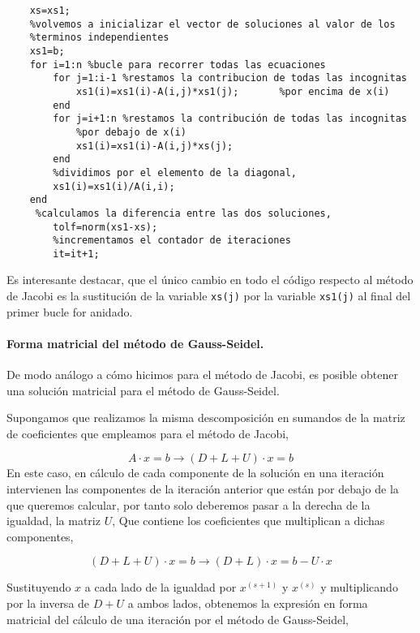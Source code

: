 \begin{verbatim}
    xs=xs1;
    %volvemos a inicializar el vector de soluciones al valor de los
    %terminos independientes
    xs1=b; 
    for i=1:n %bucle para recorrer todas las ecuaciones
        for j=1:i-1 %restamos la contribucion de todas las incognitas
            xs1(i)=xs1(i)-A(i,j)*xs1(j);       %por encima de x(i)
        end
        for j=i+1:n %restamos la contribución de todas las incognitas
            %por debajo de x(i)
            xs1(i)=xs1(i)-A(i,j)*xs(j);
        end
        %dividimos por el elemento de la diagonal,
        xs1(i)=xs1(i)/A(i,i);
    end
     %calculamos la diferencia entre las dos soluciones,
        tolf=norm(xs1-xs);
        %incrementamos el contador de iteraciones
        it=it+1;
\end{verbatim}

Es interesante destacar, que el único cambio en todo el código respecto al método de Jacobi es la sustitución de la variable \texttt{xs(j)} por la variable \texttt{xs1(j)} al final del primer bucle for anidado.

\paragraph{Forma matricial del método de Gauss-Seidel.}  De modo análogo a cómo hicimos para el método de Jacobi, es posible obtener una solución matricial para el método de Gauss-Seidel. 

Supongamos que realizamos la misma descomposición en sumandos de la matriz de coeficientes que empleamos para el método de Jacobi,

\begin{equation*}
A\cdot x =b \rightarrow (D+L+U)\cdot x=b
\end{equation*}  
En este caso, en cálculo de cada componente de la solución en una iteración intervienen las componentes de la iteración anterior que están por debajo de la que queremos calcular, por tanto solo deberemos pasar a la derecha de la igualdad, la matriz $U$, Que contiene los coeficientes que multiplican a dichas componentes,

\begin{equation*}
(D+L+U)\cdot x=b \rightarrow (D+L)\cdot x= b-U\cdot x
\end{equation*}

Sustituyendo $x$ a cada lado de la igualdad por $x^{(s+1)}$ y $x^{(s)}$ y multiplicando por la inversa de $D+U$ a ambos lados, obtenemos la expresión en forma matricial del cálculo de una iteración por el método de Gauss-Seidel,

